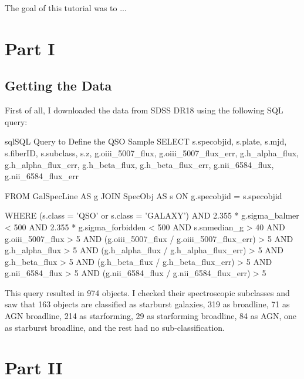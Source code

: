 \documentclass[letterpaper, oneside]{article}
\begin{document}
	
\templatePagecfg


The goal of this tutorial was to ...


\section*{Part I}

\subsection{Getting the Data}

First of all, I downloaded the data from SDSS DR18 \citep{sdss_dr18} using the following SQL query:

\begin{sourcecode}[\label{sdss_query}]{sql}{SQL Query to Define the QSO Sample}
SELECT s.specobjid, s.plate, s.mjd, s.fiberID, s.subclass, s.z, 
g.oiii_5007_flux, g.oiii_5007_flux_err, 
g.h_alpha_flux, g.h_alpha_flux_err, 
g.h_beta_flux, g.h_beta_flux_err, 
g.nii_6584_flux, g.nii_6584_flux_err

FROM GalSpecLine AS g JOIN SpecObj AS s ON
g.specobjid = s.specobjid

WHERE
(s.class = 'QSO' or s.class = 'GALAXY')
AND 2.355 * g.sigma_balmer < 500
AND 2.355 * g.sigma_forbidden < 500
AND s.snmedian_g > 40
AND g.oiii_5007_flux > 5
AND (g.oiii_5007_flux / g.oiii_5007_flux_err) > 5
AND g.h_alpha_flux > 5
AND (g.h_alpha_flux / g.h_alpha_flux_err) > 5
AND g.h_beta_flux > 5
AND (g.h_beta_flux / g.h_beta_flux_err) > 5
AND g.nii_6584_flux > 5
AND (g.nii_6584_flux / g.nii_6584_flux_err) > 5
\end{sourcecode}

This query resulted in 974 objects. I checked their spectroscopic subclasses and saw that 163 objects are classified as starburst galaxies, 319 as broadline, 71 as AGN broadline, 214 as starforming, 29 as starforming broadline, 84 as AGN, one as starburst broadline, and the rest had no sub-classification.




\section*{Part II}
\end{document}
